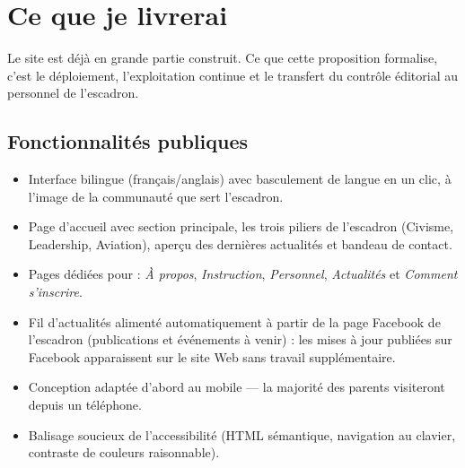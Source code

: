 \documentclass[11pt,letterpaper]{article}
\begin{document}
\section{Ce que je livrerai}

Le site est déjà en grande partie construit. Ce que cette proposition formalise, c'est le déploiement, l'exploitation continue et le transfert du contrôle éditorial au personnel de l'escadron.

\subsection{Fonctionnalités publiques}
\begin{itemize}[leftmargin=1.4em,itemsep=0.25em]
  \item Interface bilingue (français/anglais) avec basculement de langue en un clic, à l'image de la communauté que sert l'escadron.
  \item Page d'accueil avec section principale, les trois piliers de l'escadron (Civisme, Leadership, Aviation), aperçu des dernières actualités et bandeau de contact.
  \item Pages dédiées pour : \emph{À propos}, \emph{Instruction}, \emph{Personnel}, \emph{Actualités} et \emph{Comment s'inscrire}.
  \item Fil d'actualités alimenté automatiquement à partir de la page Facebook de l'escadron (publications et événements à venir) : les mises à jour publiées sur Facebook apparaissent sur le site Web sans travail supplémentaire.
  \item Conception adaptée d'abord au mobile --- la majorité des parents visiteront depuis un téléphone.
  \item Balisage soucieux de l'accessibilité (HTML sémantique, navigation au clavier, contraste de couleurs raisonnable).
\end{itemize}
\end{document}
